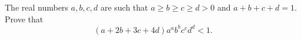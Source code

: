 The real numbers $a,b,c,d$ are such that $a\geq b\geq c\geq d>0$ and $a+b+c+d=1$. Prove that
\[
	(a+2b+3c+4d)a^ab^bc^cd^d<1.
\]
